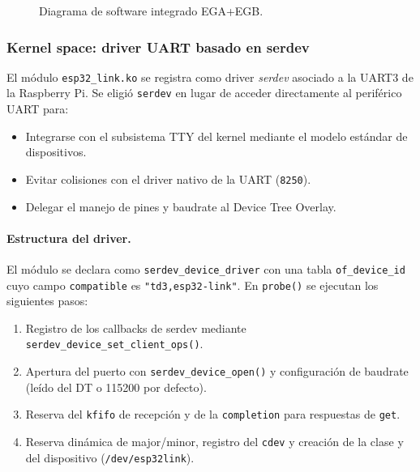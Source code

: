 \documentclass[RT]{UTNLSE}
\begin{document}
\begin{figure}[H]
\caption{Diagrama de software integrado EGA+EGB.}
\label{fig:software_integrado}
\end{figure}

\subsubsection{Kernel space: driver UART basado en serdev}

El módulo \texttt{esp32\_link.ko} se registra como driver \textit{serdev} asociado a la UART3 de la Raspberry Pi. Se eligió \texttt{serdev} en lugar de acceder directamente al periférico UART para:

\begin{itemize}
    \item Integrarse con el subsistema TTY del kernel mediante el modelo estándar de dispositivos.
    \item Evitar colisiones con el driver nativo de la UART (\texttt{8250}).
    \item Delegar el manejo de pines y baudrate al Device Tree Overlay.
\end{itemize}

\paragraph{Estructura del driver.} El módulo se declara como \texttt{serdev\_device\_driver} con una tabla \texttt{of\_device\_id} cuyo campo \texttt{compatible} es \texttt{"td3,esp32-link"}. En \texttt{probe()} se ejecutan los siguientes pasos:

\begin{enumerate}
    \item Registro de los callbacks de serdev mediante \texttt{serdev\_device\_set\_client\_ops()}.
    \item Apertura del puerto con \texttt{serdev\_device\_open()} y configuración de baudrate (leído del DT o 115200 por defecto).
    \item Reserva del \texttt{kfifo} de recepción y de la \texttt{completion} para respuestas de \texttt{get}.
    \item Reserva dinámica de major/minor, registro del \texttt{cdev} y creación de la clase y del dispositivo (\texttt{/dev/esp32link}).
\end{enumerate}
\end{document}
